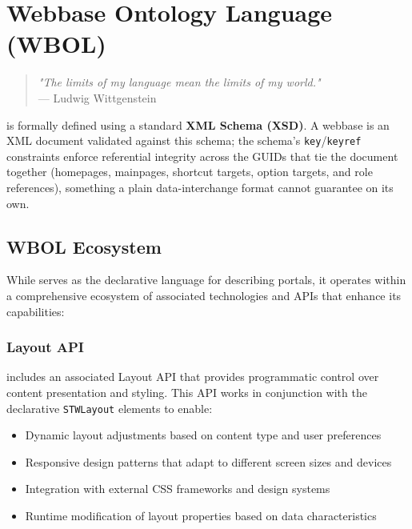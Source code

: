 
\chapter{Webbase Ontology Language (WBOL)}
\label{chap:wbol}

\begin{quote}
\textit{"The limits of my language mean the limits of my world."} \\
— Ludwig Wittgenstein
\end{quote}

\wbol{} is formally defined using a standard \textbf{XML Schema (XSD)}. A webbase is an XML document validated against this schema; the schema's \texttt{key}/\texttt{keyref} constraints enforce referential integrity across the GUIDs that tie the document together (homepages, mainpages, shortcut targets, option targets, and role references), something a plain data-interchange format cannot guarantee on its own.

\section{WBOL Ecosystem}
\label{sec:wbol-ecosystem}

While \wbol{} serves as the declarative language for describing portals, it operates within a comprehensive ecosystem of associated technologies and APIs that enhance its capabilities:

\subsection{Layout API}
\label{sec:layout-api}

\wbol{} includes an associated Layout API that provides programmatic control over content presentation and styling. This API works in conjunction with the declarative \texttt{STWLayout} elements to enable:

\begin{itemize}
\item Dynamic layout adjustments based on content type and user preferences
\item Responsive design patterns that adapt to different screen sizes and devices
\item Integration with external CSS frameworks and design systems
\item Runtime modification of layout properties based on data characteristics
\end{itemize}

